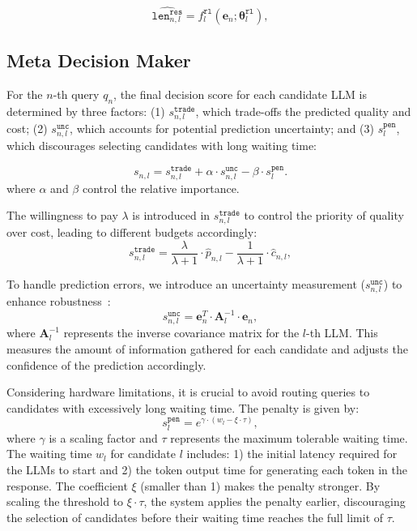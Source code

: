 \begin{equation}
    \hat{\texttt{len}_{n,l}^{\texttt{res}}} = f_l^\texttt{rl}(\mathbf{e}_n; \boldsymbol{\theta}_l^\texttt{rl}),
\end{equation}


\subsection{Meta Decision Maker}

For the $n$-th query $q_n$, the final decision score for each candidate LLM is determined by three factors: (1) $s_{n,l}^\texttt{trade}$, which trade-offs the predicted quality and cost; (2) $s_{n,l}^\texttt{unc}$, which accounts for potential prediction uncertainty; and (3) $s_{l}^\texttt{pen}$, which discourages selecting candidates with long waiting time:

\begin{equation} \label{final_scores}
    s_{n,l} = s_{n,l}^\texttt{trade} + \alpha \cdot s_{n,l}^\texttt{unc} - \beta \cdot s_{l}^\texttt{pen}.
\end{equation}
where $\alpha$ and $\beta$ control the relative importance.

The willingness to pay $\lambda$ is introduced in $s_{n,l}^\texttt{trade}$ to control the priority of quality over cost, leading to different budgets accordingly:
\begin{equation}
\label{reward_score}
    s_{n,l}^\texttt{trade} = \frac{\lambda}{\lambda + 1} \cdot \hat{p}_{n,l} - \frac{1}{\lambda + 1} \cdot \hat{c}_{n,l},
\end{equation}


To handle prediction errors, we introduce an uncertainty measurement ($s_{n,l}^\texttt{unc}$) to enhance robustness~\cite{li2010contextual}:
\begin{equation}
    s_{n,l}^\texttt{unc} = \mathbf{e}_n^T \cdot \mathbf{A}_l^{-1} \cdot \mathbf{e}_n,
\end{equation}
where \( \mathbf{A}_l^{-1} \) represents the inverse covariance matrix for the \( l \)-th LLM. This measures the amount of information gathered for each candidate and adjusts the confidence of the prediction accordingly. 


Considering hardware limitations, it is crucial to avoid routing queries to candidates with excessively long waiting time. The penalty is given by:
\begin{equation}
\label{penalty_score}
    s_{l}^\texttt{pen} = e^{\gamma \cdot (w_l - \xi \cdot \tau)},
\end{equation}
where $\gamma$ is a scaling factor and $\tau$ represents the maximum tolerable waiting time. 
The waiting time $w_l$ for candidate $l$ includes: 1) the initial latency required for the LLMs to start and 2) the token output time for generating each token in the response.
The coefficient $\xi$ (smaller than 1) makes the penalty stronger. By scaling the threshold to $\xi \cdot \tau$, the system applies the penalty earlier, discouraging the selection of candidates before their waiting time reaches the full limit of $\tau$.



